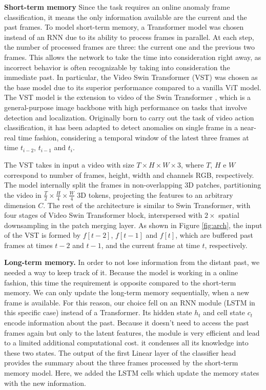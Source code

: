 \noindent\textbf{Short-term memory}
Since the task requires an online anomaly frame classification, it means the only information available are the current and the past frames.
To model short-term memory, a Transformer model was chosen instead of an RNN due to its ability to process frames in parallel.
At each step, the number of processed frames are three: the current one and the previous two frames.
This allows the network to take the time into consideration right away, as incorrect behavior is often recognizable by taking into consideration the immediate past.
In particular, the Video Swin Transformer (VST) \cite{liu_video_2022} was chosen as the base model due to its superior performance compared to a vanilla ViT \cite{DBLP:conf/iclr/DosovitskiyB0WZ21} model.
The VST model is the extension to video of the Swin Transformer \cite{liu2021Swin}, which is a general-purpose image backbone with high performance on tasks that involve detection and localization.
Originally born to carry out the task of video action classification, it has been adapted to detect anomalies on single frame in a near-real time fashion, considering a temporal window of the latest three frames at time $t_{i-2}$, $t_{i-1}$ and $t_{i}$.

The VST takes in input a video with size $T \times H \times W \times 3$, where $T$, $H$ e $W$ correspond to number of frames, height, width and channels RGB, respectively.
The model internally split the frames in non-overlapping 3D patches, partitioning the video in $\frac{T}{2} \times \frac{H}{4} \times \frac{W}{4}$ 3D tokens, projecting the features to an arbitrary dimension $C$.
The rest of the architecture is similar to Swin Transformer, with four stages of Video Swin Transformer block, interspersed with $2\times$ spatial downsampling in the patch merging layer.
As shown in Figure \ref{fig:arch}, the input of the VST is formed by $f[t-2]$, $f[t-1]$ and $f[t]$, which are buffered past frames at times $t-2$ and $t-1$, and the current frame at time $t$, respectively.

\noindent\textbf{Long-term memory.}
In order to not lose information from the distant past, we needed a way to keep track of it.
Because the model is working in a online fashion, this time the requirement is opposite compared to the short-term memory.
We can only update the long-term memory sequentially, when a new frame is available.
For this reason, our choice fell on an RNN module (LSTM in this specific case) instead of a Transformer.
Its hidden state $h_t$ and cell state $c_t$ encode information about the past.
Because it doesn't need to access the past frames again but only to the latent features, the module is very efficient and lead to a limited additional computational cost.
it condenses all its knowledge into these two states.
The output of the first Linear layer of the classifier head provides the summary about the three frames processed by the short-term memory model.
Here, we added the LSTM cells which update the memory states with the new information.

